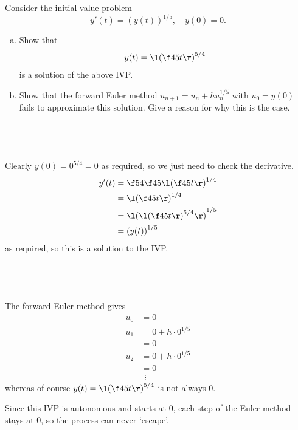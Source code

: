 \documentclass[a4paper]{article}
\begin{document}


\begin{questionbody}
Consider the initial value problem \[
y'(t) = {(y(t))}^{1/5}, \quad y(0) = 0.
\]
\begin{enumerate}[(a)]
\item Show that \[
y(t) = {\l( \f45 t \r)}^{5/4}
\] is a solution of the above IVP\@.

\item Show that the forward Euler method $u_{n+1} = u_n + h u_n^{1/5}$ with $u_0 = y(0)$ fails to approximate this solution. Give a reason for why this is the case.
\end{enumerate}
\end{questionbody}

\subsection{~} %

Clearly $y(0) = 0^{5/4} = 0$ as required, so we just need to check the derivative.
\begin{align*}
y'(t) &= \f54 \f45 {\l( \f45 t \r)}^{1/4} \\
&= {\l( \f45 t \r)}^{1/4} \\
&= {\l( {\l( \f45 t \r)}^{5/4} \r)}^{1/5} \\
&= {(y(t))}^{1/5}
\end{align*}
as required, so this is a solution to the IVP\@.

\subsection{~} %

The forward Euler method gives
\begin{align*}
u_0 &= 0 \\
u_1 &= 0 + h \cdot 0^{1/5} \\
&= 0 \\
u_2 &= 0 + h \cdot 0^{1/5} \\
&= 0 \\
&\ \ \vdots
\end{align*}
whereas of course $y(t) = {\l(\f45 t\r)}^{5/4}$ is not always 0.

Since this IVP is autonomous and starts at 0, each step of the Euler method stays at 0, so the process can never `escape'.

\end{document}

